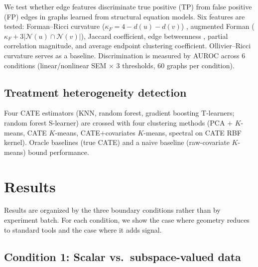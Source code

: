 \documentclass{article}
\begin{document}
We test whether edge features discriminate true positive (TP) from false positive (FP) edges in graphs learned from structural equation models.
Six features are tested: Forman--Ricci curvature ($\kappa_F = 4 - d(u) - d(v)$) \citep{forman2003bochner}, augmented Forman ($\kappa_F + 3|\mathcal{N}(u) \cap \mathcal{N}(v)|$), Jaccard coefficient, edge betweenness \citep{girvan2002community}, partial correlation magnitude, and average endpoint clustering coefficient.
Ollivier--Ricci curvature \citep{ollivier2009ricci, ni2019community} serves as a baseline.
Discrimination is measured by AUROC across 6 conditions (linear/nonlinear SEM $\times$ 3 thresholds, 60 graphs per condition).

\subsection{Treatment heterogeneity detection}
\label{sec:meth-hte}

Four CATE estimators (KNN, random forest, gradient boosting T-learners; random forest S-learner) are crossed with four clustering methods (PCA $+$ $K$-means, CATE $K$-means, CATE$+$covariates $K$-means, spectral on CATE RBF kernel).
Oracle baselines (true CATE) and a naive baseline (raw-covariate $K$-means) bound performance.

\section{Results}
\label{sec:results}

Results are organized by the three boundary conditions rather than by experiment batch.
For each condition, we show the case where geometry reduces to standard tools and the case where it adds signal.

\subsection{Condition 1: Scalar vs.\ subspace-valued data}
\label{sec:ms}
\label{sec:res-scalar-vs-subspace}
\end{document}
